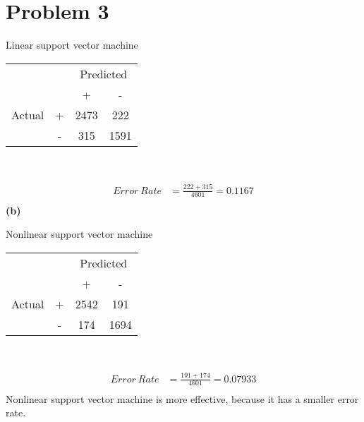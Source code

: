 \documentclass[11pt]{scrartcl}
\begin{document}
\section*{Problem 3}
\begin{center}
Linear support vector machine\\
\begin{tabular}{|c|c|c|c|}
		\hline
		\multicolumn{2}{|c|}{}
		&\multicolumn{2}{|c|}{Predicted}\\
		\cline{3-4}
		\multicolumn{2}{|c|}{}& +  & -  \\
		\cline{1-4}
		Actual & +         & 2473 & 222 \\
		\cline{2-4}
		       & -         & 315 & 1591\\
		\hline
\end{tabular}\\
\end{center}
\begin{equation*}
\begin{aligned}
 Error\ Rate&=\frac{222+315}{4601}=0.1167\\
\end{aligned}
\end{equation*}
\textbf{(b)}
\begin{center}
Nonlinear support vector machine\\
	\begin{tabular}{|c|c|c|c|}
		\hline
		\multicolumn{2}{|c|}{}
		&\multicolumn{2}{|c|}{Predicted}\\
		\cline{3-4}
		\multicolumn{2}{|c|}{}& +  & -  \\
		\cline{1-4}
		Actual & +         & 2542 & 191 \\
		\cline{2-4}
		& -         & 174 & 1694 \\
		\hline
	\end{tabular}\\
\end{center}
\begin{equation*}
\begin{aligned}
	Error\ Rate&=\frac{191+174}{4601}=0.07933\\
\end{aligned}
\end{equation*}
Nonlinear support vector machine is more effective, because it has a smaller error rate.
\end{document}
